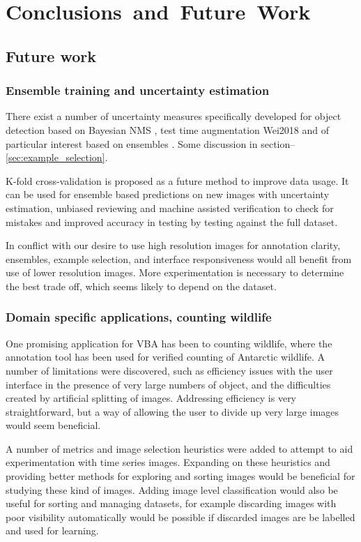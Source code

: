 \chapter{Conclusions~and~Future~Work}
\label{chap:future} 


\section{Future work}
\subsection{Ensemble training and uncertainty estimation}

There exist a number of uncertainty measures specifically developed for object detection based on Bayesian \gls{NMS} \cite{Harakeh}, test time augmentation {Wei2018} and of particular interest based on ensembles \cite{Le2018}. Some discussion in section--\ref{sec:example_selection}. 

K-fold cross-validation is proposed as a future method to improve data usage. It can be used for ensemble based predictions on new images with uncertainty estimation, unbiased reviewing and machine assisted verification to check for mistakes and improved accuracy in testing by testing against the full dataset.

In conflict with our desire to use high resolution images for annotation clarity, ensembles, example selection, and interface responsiveness would all benefit from use of lower resolution images. More experimentation is necessary to determine the best trade off, which seems likely to depend on the dataset.

\subsection{Domain specific applications, counting wildlife}

One promising application for \gls{VBA} has been to counting wildlife, where the annotation tool has been used for verified counting of Antarctic wildlife. A number of limitations were discovered, such as efficiency issues with the user interface in the presence of very large numbers of object, and the difficulties created by artificial splitting of images. Addressing efficiency is very straightforward, but a way of allowing the user to divide up very large images would seem beneficial.

A number of metrics and image selection heuristics were added to attempt to aid experimentation with time series images. Expanding on these heuristics and providing better methods for exploring and sorting images would be beneficial for studying these kind of images. Adding image level classification would also be useful for sorting and managing datasets, for example discarding images with poor visibility automatically would be possible if discarded images are be labelled and used for learning.

